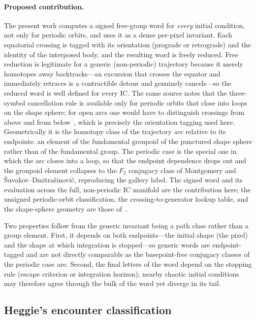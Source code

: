\documentclass[11pt,a4paper]{article}
\begin{document}
\paragraph{Proposed contribution.}
The present work computes a signed free-group word for \emph{every} initial condition, not only
for periodic orbits, and uses it as a dense per-pixel invariant.  Each equatorial crossing is
tagged with its orientation (prograde or retrograde) and the identity of the interposed body,
and the resulting word is freely reduced.  Free reduction is legitimate for a generic
(non-periodic) trajectory because it merely homotopes away backtracks---an excursion that
crosses the equator and immediately retraces is a contractible detour and genuinely cancels---so
the reduced word is well defined for every IC.  The same source notes that the three-symbol cancellation rule is available only for
periodic orbits that close into loops on the shape sphere; for open arcs one would have to
distinguish crossings from above and from below~\cite{dmitrasinovic2018}, which is precisely
the orientation tagging used here.  Geometrically it is the homotopy class of the
trajectory \emph{arc} relative to its endpoints: an element of the fundamental groupoid of the
punctured shape sphere rather than of the fundamental group.  The periodic case is the special
one in which the arc closes into a loop, so that the endpoint dependence drops out and the
groupoid element collapses to the $F_2$ conjugacy class of Montgomery and
\v{S}uvakov--Dmitra\v{s}inovi\'{c}, reproducing the gallery label.  The signed word and its
evaluation across the full, non-periodic IC manifold are the contribution here; the unsigned
periodic-orbit classification, the crossing-to-generator lookup table, and the shape-sphere
geometry are those
of~\cite{tanikawa2015,tanikawa2000,montgomery2015,montgomery1998,suvakov2013,suvakov2014}.

Two properties follow from the generic invariant being a path class rather than a group element.
First, it depends on both endpoints---the initial shape (the pixel) and the shape at which
integration is stopped---so generic words are endpoint-tagged and are not directly comparable as
the basepoint-free conjugacy classes of the periodic case are.  Second, the final letters of the
word depend on the stopping rule (escape criterion or integration horizon); nearby chaotic
initial conditions may therefore agree through the bulk of the word yet diverge in its tail.

\subsection{Heggie's encounter classification}
\end{document}
